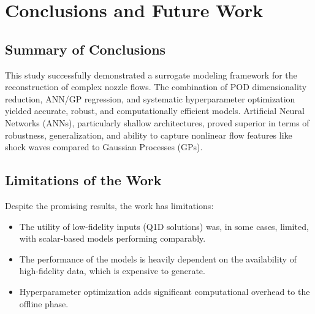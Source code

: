 \documentclass[dscexam, EN]{ufabcFHZh}
\begin{document}
\chapter{Conclusions and Future Work}

\section{Summary of Conclusions}
This study successfully demonstrated a surrogate modeling framework for the reconstruction of complex nozzle flows. The combination of POD dimensionality reduction, ANN/GP regression, and systematic hyperparameter optimization yielded accurate, robust, and computationally efficient models. Artificial Neural Networks (ANNs), particularly shallow architectures, proved superior in terms of robustness, generalization, and ability to capture nonlinear flow features like shock waves compared to Gaussian Processes (GPs).

\section{Limitations of the Work}
Despite the promising results, the work has limitations:
\begin{itemize}
    \item The utility of low-fidelity inputs (Q1D solutions) was, in some cases, limited, with scalar-based models performing comparably.
    \item The performance of the models is heavily dependent on the availability of high-fidelity data, which is expensive to generate.
    \item Hyperparameter optimization adds significant computational overhead to the offline phase.
\end{itemize}
\end{document}
